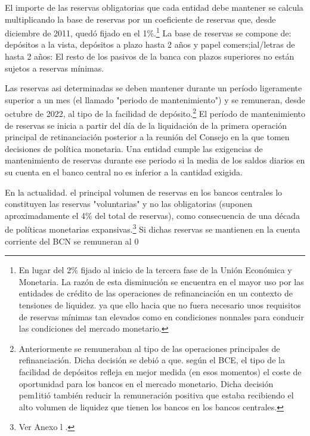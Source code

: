 \documentclass[10pt,a4paper]{article}
\begin{document}
{El importe de las reservas obligatorias que cada entidad debe mantener se calcula multiplicando la base de reservas por un coeficiente de reservas que, desde diciembre de 2011, quedó fijado en el 1\%.\footnote{%
    En lugar del 2\% fijado al inicio de la tercera fase de la Unión Económica y Monetaria. La razón de esta disminución se encuentra en el mayor uso por las entidades de crédito de las operaciones de refinanciación en un contexto de tensiones de liquidez. ya que ello hacia que no fuera necesario unos requisitos de reservas mínimas tan elevados como en condiciones nonnales para conducir las condiciones del mercado monetario.
} La base de reservas se compone de: depósitos a la vista, depósitos a plazo hasta 2 años y papel comers;ial/letras de hasta 2 años: El resto de los pasivos de la banca con plazos superiores no están sujetos a reservas mínimas.

Las reservas asi determinadas se deben mantener durante un período ligeramente superior a un mes (el llamado "periodo de mantenimiento") y se remuneran, desde octubre de 2022, al tipo de la facilidad de depósito.\footnote{%
    Anteriormente se remuneraban al tipo de las operaciones principales de refinanciación. Dicha decisión se debió a que. según el BCE, el tipo de la facilidad de depósitos refleja en mejor medida (en esos momentos) el coste de oportunidad para los bancos en el mercado monetario. Dicha decisión pem1itió también reducir la remuneración positiva que estaba recibiendo el alto volumen de liquidez que tienen los bancos en los bancos centrales.
} El período de mantenimiento de reservas se inicia a partir del día de la liquidación de la primera operación principal de retinanciación posterior a la reunión del Consejo en la que tomen decisiones de política monetaria. Una entidad cumple las exigencias de mantenimiento de reservas durante ese periodo si la media de los saldos diarios en su cuenta en el banco central no es inferior a la cantidad exigida. 

En la actualidad. el principal volumen de reservas en los bancos centrales lo constituyen las reservas "voluntarias" y no las obligatorias (suponen aproximadamente el 4\% del total de reservas), como consecuencia de una década de políticas monetarias expansivas.\footnote{Ver Anexo l .
} Si dichas reservas se mantienen en la cuenta corriente del BCN se remuneran al 0%

}
\end{document}

